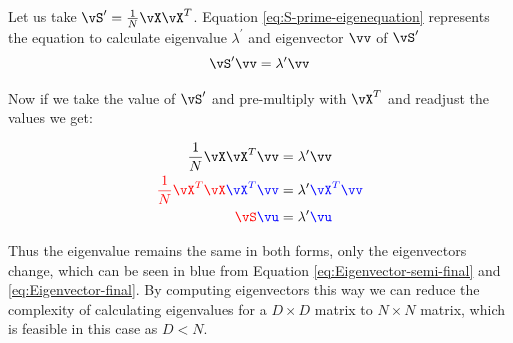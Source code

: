 \documentclass[a4paper,11pt]{article}
\begin{document}
\begin{mlsolution}

\noindent Let us take $\vS^{\prime}=\frac{1}{N}\vX\vX^T$. Equation \ref{eq:S-prime-eigenequation} represents the equation to calculate eigenvalue $\lambda^{\prime}$ and eigenvector $\vv$ of $\vS^{\prime}$
\begin{equation}
    \vS^{\prime} \vv = \lambda^{\prime} \vv
    \label{eq:S-prime-eigenequation}
\end{equation}

\noindent Now if we take the value of $\vS^{\prime}$ and pre-multiply with $\vX^T$ and readjust the values we get:

\begin{align}
    \frac{1}{N}\vX\vX^T\vv &= \lambda^{\prime} \vv \\
    \red{\frac{1}{N}\vX^T\vX}\blue{\vX^T\vv} &= \lambda^{\prime} \blue{\vX^T \vv} \label{eq:Eigenvector-semi-final} \\
    \red{\vS} \blue{\vu} &= \lambda^{\prime} \blue{\vu}
    \label{eq:Eigenvector-final}
\end{align}

\noindent Thus the eigenvalue remains the same in both forms, only the eigenvectors change, which can be seen in blue from Equation \ref{eq:Eigenvector-semi-final} and \ref{eq:Eigenvector-final}. By computing eigenvectors this way we can reduce the complexity of calculating eigenvalues for a $D\times D$ matrix to $N\times N$ matrix, which is feasible in this case as $D<N$.

\end{mlsolution}
\end{document}
